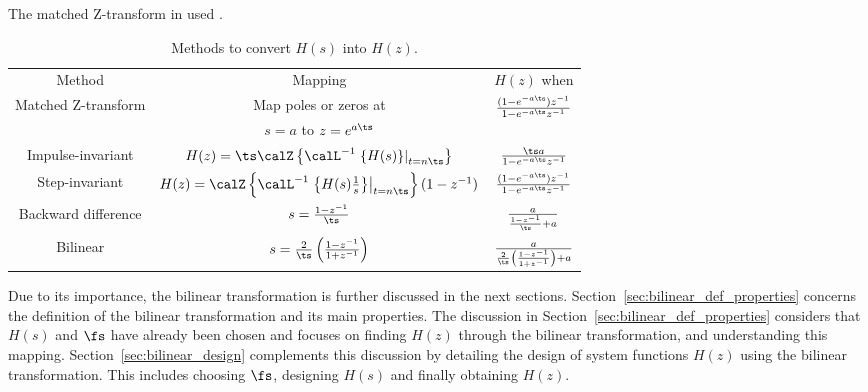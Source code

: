 The matched Z-transform in  used .

\begin{table}
\begin{center}	
	\caption{Methods to convert $H(s)$ into $H(z)$.\label{tab:HsIntoHz}}
\begin{tabular}{|c|c|c|}
\hline
\multirow{2}{*}{Method} & \multirow{2}{*}{Mapping} & \multirow{2}{*}{$H(z)$ when} \\
       &         & $H(s)=\frac{a}{s+a}$ \\ \hline
			\multirow{2}{*}{Matched Z-transform } & Map poles or zeros at & \multirow{2}{*}{$\frac{(1-e^{-a\ts})z^{-1}}{1-e^{-a \ts}z^{-1}}$}\\
& $s=a$ to $z=e^{a\ts}$ &  \\ \hline			
Impulse-invariant & $H(z) = \ts \calZ \left\{ \calL^{-1} \left. \left\{ H(s) \right\} \right|_{t=n\ts} \right\}$ & $\frac{\ts a}{1-e^{-a \ts}z^{-1}}$ \\ \hline
Step-invariant & $H(z) = \calZ \left\{ \calL^{-1} \left. \left\{ H(s) \frac{1}{s} \right\} \right|_{t=n\ts} \right\} (1-z^{-1})$ & $\frac{(1-e^{-a \ts})z^{-1}}{1-e^{-a \ts}z^{-1}}$ \\ \hline
			Backward difference & $s=\frac{1-z^{-1}}{\ts}$ & $\frac{a}{\frac{1-z^{-1}}{\ts}+a}$ \\ \hline
Bilinear & $s=\frac{2}{\ts}\left(\frac{1-z^{-1}}{1+z^{-1}}\right)$ & $\frac{a}{\frac{2}{\ts}\left(\frac{1-z^{-1}}{1+z^{-1}}\right)+a}$ \\ \hline
\end{tabular}
\end{center}
\end{table}

Due to its importance, the bilinear transformation is further discussed in the next sections.
Section~\ref{sec:bilinear_def_properties} concerns the definition of the bilinear transformation
and its main properties. 
The discussion in Section~\ref{sec:bilinear_def_properties} considers that $H(s)$ and $\fs$ 
have already been chosen and focuses on finding $H(z)$ through the bilinear transformation, and understanding
this mapping. 
Section~\ref{sec:bilinear_design} complements this discussion by detailing the design
of system functions $H(z)$ using the bilinear transformation. This includes choosing $\fs$, 
designing $H(s)$ and finally obtaining $H(z)$.

